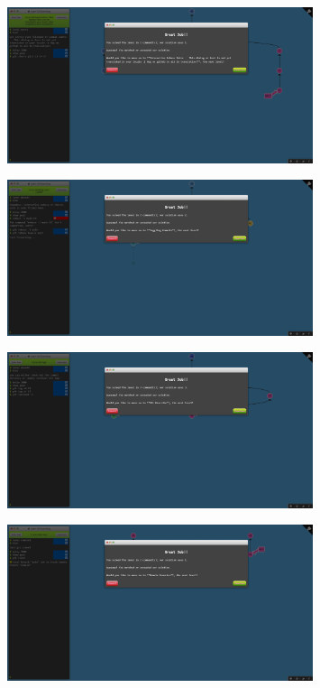 \documentclass[a4paper]{article}
\begin{document}
\begin{figure}[H]
    \centering
    \includegraphics[width=0.8\textwidth]{12.png}
\end{figure}
\begin{figure}[H]
    \centering
    \includegraphics[width=0.8\textwidth]{13.png}
\end{figure}
\begin{figure}[H]
    \centering
    \includegraphics[width=0.8\textwidth]{14.png}
\end{figure}
\begin{figure}[H]
    \centering
    \includegraphics[width=0.8\textwidth]{15.png}
\end{figure}
\end{document}
